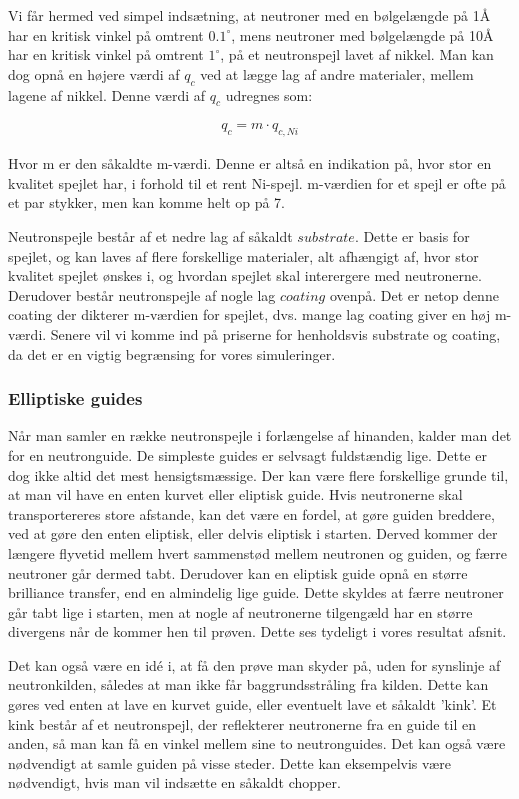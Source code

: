 \documentclass[12pt,oneside,a4paper]{article}
\begin{document}
{{{{{Vi får hermed ved simpel indsætning, at neutroner med en bølgelængde på 1Å har en kritisk vinkel på omtrent $0.1^∘$, mens neutroner med bølgelængde på 10Å har en kritisk vinkel på omtrent $1^∘$, på et neutronspejl lavet af nikkel.
Man kan dog opnå en højere værdi af $q_c$ ved at lægge lag af andre materialer, mellem lagene af nikkel. Denne værdi af $q_c$ udregnes som:

\begin{align}
q_c=m \cdot q_{c,Ni}
\end{align}

Hvor m er den såkaldte m-værdi. Denne er altså en indikation på, hvor stor en kvalitet spejlet har, i forhold til et rent Ni-spejl. m-værdien for et spejl er ofte på et par stykker, men kan komme helt op på 7. \cite{lefmann_arleth_kirkensgaard_lebech_thomsen}

Neutronspejle består af et nedre lag af såkaldt $substrate$. Dette er basis for spejlet, og kan laves af flere forskellige materialer, alt afhængigt af, hvor stor kvalitet spejlet ønskes i, og hvordan spejlet skal interergere med neutronerne. Derudover består neutronspejle af nogle lag $coating$ ovenpå. Det er netop denne coating der dikterer m-værdien for spejlet, dvs. mange lag coating giver en høj m-værdi. Senere vil vi komme ind på priserne for henholdsvis substrate og coating, da det er en vigtig begrænsing for vores simuleringer.

\subsubsection{Elliptiske guides}
Når man samler en række neutronspejle i forlængelse af hinanden, kalder man det for en neutronguide. De simpleste guides er selvsagt fuldstændig lige. Dette er dog ikke altid det mest hensigtsmæssige. Der kan være flere forskellige grunde til, at man vil have en enten kurvet eller eliptisk guide. 
Hvis neutronerne skal transportereres store afstande, kan det være en fordel, at gøre guiden breddere, ved at gøre den enten eliptisk, eller delvis eliptisk i starten. Derved kommer der længere flyvetid mellem hvert sammenstød mellem neutronen og guiden, og færre neutroner går dermed tabt. 
Derudover kan en eliptisk guide opnå en større brilliance transfer, end en almindelig lige guide. Dette skyldes at færre neutroner går tabt lige  i starten, men at nogle af neutronerne tilgengæld har en større divergens når de kommer hen til prøven. Dette ses tydeligt i vores resultat afsnit.

Det kan også være en idé i, at få den prøve man skyder på, uden for synslinje af neutronkilden, således at man ikke får baggrundsstråling fra kilden. Dette kan gøres ved enten at lave en kurvet guide, eller eventuelt lave et såkaldt 'kink'. Et kink består af et neutronspejl, der reflekterer neutronerne fra en guide til en anden, så man kan få en vinkel mellem sine to neutronguides. 
Det kan også være nødvendigt at samle guiden på visse steder. Dette kan eksempelvis være nødvendigt, hvis man vil indsætte en såkaldt chopper.

}}}}}
\end{document}
